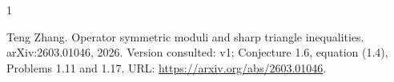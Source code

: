 \documentclass[10pt,a4paper]{article}
\theoremstyle{remark}
\begin{document}
\begin{thebibliography}{1}

Teng Zhang.
\newblock Operator symmetric moduli and sharp triangle inequalities.
\newblock arXiv:2603.01046, 2026.
\newblock Version consulted: v1; Conjecture 1.6, equation (1.4), Problems 1.11
  and 1.17.
\newblock URL: \url{https://arxiv.org/abs/2603.01046}.

\end{thebibliography}
\end{document}
